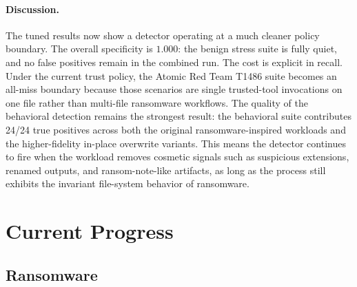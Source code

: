 \documentclass[twocolumn, 10pt]{scrartcl}
\begin{document}
\paragraph{Discussion.}
The tuned results now show a detector operating at a much cleaner policy boundary. The overall specificity is $1.000$: the benign stress suite is fully quiet, and no false positives remain in the combined run. The cost is explicit in recall. Under the current trust policy, the Atomic Red Team T1486 suite becomes an all-miss boundary because those scenarios are single trusted-tool invocations on one file rather than multi-file ransomware workflows. The quality of the behavioral detection remains the strongest result: the behavioral suite contributes 24/24 true positives across both the original ransomware-inspired workloads and the higher-fidelity in-place overwrite variants. This means the detector continues to fire when the workload removes cosmetic signals such as suspicious extensions, renamed outputs, and ransom-note-like artifacts, as long as the process still exhibits the invariant file-system behavior of ransomware.

\section{Current Progress}

\subsection{Ransomware}
\end{document}
